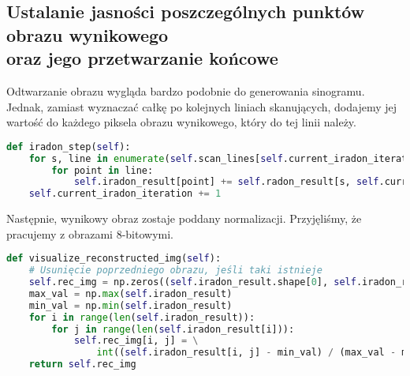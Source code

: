 \documentclass[a4paper]{article}
\begin{document}
\subsection{Ustalanie jasności poszczególnych punktów obrazu wynikowego\\ oraz jego przetwarzanie końcowe}
Odtwarzanie obrazu wygląda bardzo podobnie do generowania sinogramu. Jednak, zamiast wyznaczać całkę po kolejnych liniach skanujących, dodajemy jej wartość do każdego piksela obrazu wynikowego, który do tej linii należy.
\begin{lstlisting}[language=Python, caption=Krok odtwarzania obrazu, texcl=true]
def iradon_step(self):
    for s, line in enumerate(self.scan_lines[self.current_iradon_iteration]):
        for point in line:
            self.iradon_result[point] += self.radon_result[s, self.current_iradon_iteration]
    self.current_iradon_iteration += 1
\end{lstlisting}
Następnie, wynikowy obraz zostaje poddany normalizacji. Przyjęliśmy, że pracujemy z obrazami 8-bitowymi.
\begin{lstlisting}[language=Python, caption=Normalizacja odtworzonego obrazu, texcl=true]
def visualize_reconstructed_img(self):
    # Usunięcie poprzedniego obrazu, jeśli taki istnieje
    self.rec_img = np.zeros((self.iradon_result.shape[0], self.iradon_result.shape[1]), dtype=np.uint8)
    max_val = np.max(self.iradon_result)
    min_val = np.min(self.iradon_result)
    for i in range(len(self.iradon_result)):
        for j in range(len(self.iradon_result[i])):
            self.rec_img[i, j] = \
                int((self.iradon_result[i, j] - min_val) / (max_val - min_val) * 255)
    return self.rec_img
\end{lstlisting}
\end{document}
